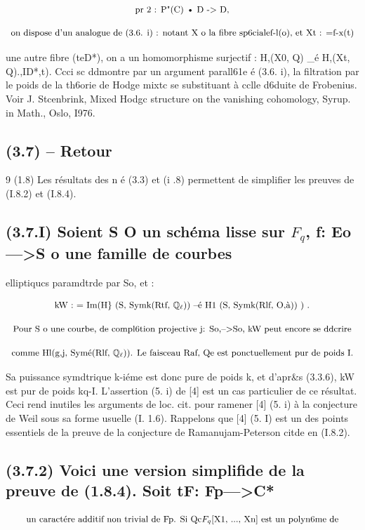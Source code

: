 \documentclass[11pt]{article}
\theoremstyle{remark}
\begin{document}
\[\text{\small pr 2 : P"(C) • D -> D,}\]

\[\text{\small on dispose d'un analogue de (3.6. i) : notant X o la fibre sp6cialef-l(o), et Xt : =f-x(t)}\]

une autre fibre (teD*), on a un homomorphisme surjectif : H,(X0, Q) \_é H,(Xt, Q).,ID*,t). Ccci sc ddmontre par un argument parall61e é (3.6. i), la filtration par le poids de la th6orie de Hodge mixtc se substituant à cclle d6duite de Frobenius. Voir J. Stcenbrink, Mixed Hodgc structure on the vanishing cohomology, Syrup. in Math., Oslo, I976.

\subsection*{(3.7) -- Retour}

9 (1.8) Les résultats des n é (3.3) et (i .8) permettent de simplifier les preuves de (I.8.2) et (I.8.4).

\subsection*{(3.7.I) Soient S O un schéma lisse sur \(F_q\), f: Eo--->S o une famille de courbes}

elliptiqucs paramdtrde par So, et :

\[\text{\small kW : = Im(H\} (S, Symk(Rtf, \(\mathbb{Q}_{\ell}\))) --é H1 (S, Symk(Rlf, O,à)) ) .}\]

\[\text{\small Pour S o une courbe, de compl6tion projective j: So,-->So, kW peut encore se ddcrire}\]

\[\text{\small comme Hl(g,j, Symé(Rlf, \(\mathbb{Q}_{\ell}\))). Le faisceau Raf, Qe est ponctuellement pur de poids I.}\]

Sa puissance symdtrique k-iéme est donc pure de poids k, et d'apr\&s (3.3.6), kW est pur de poids kq-I. L'assertion (5. i) de [4] est un cas particulier de ce résultat. Ceci rend inutiles les arguments de loc. cit. pour ramener [4] (5. i) à la conjecture de Weil sous sa forme usuelle (I. 1.6). Rappelons que [4] (5. I) est un des points essentiels de la preuve de la conjecture de Ramanujam-Peterson citde en (I.8.2).

\subsection*{(3.7.2) Voici une version simplifide de la preuve de (1.8.4). Soit tF: Fp--->C*}

\[\text{\small un caractére additif non trivial de Fp. Si Qc\(F_q\)[X1, ..., Xn] est un polyn6me de}\]
\end{document}
